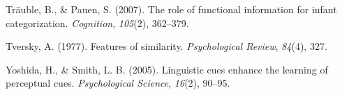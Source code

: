 \documentclass[10pt, letterpaper]{article}
\begin{document}
\hypertarget{ref-trauble2007role}{}
Träuble, B., \& Pauen, S. (2007). The role of functional information for
infant categorization. \emph{Cognition}, \emph{105}(2), 362--379.

\hypertarget{ref-tversky1977features}{}
Tversky, A. (1977). Features of similarity. \emph{Psychological Review},
\emph{84}(4), 327.

\hypertarget{ref-yoshida2005linguistic}{}
Yoshida, H., \& Smith, L. B. (2005). Linguistic cues enhance the
learning of perceptual cues. \emph{Psychological Science}, \emph{16}(2),
90--95.
\end{document}
